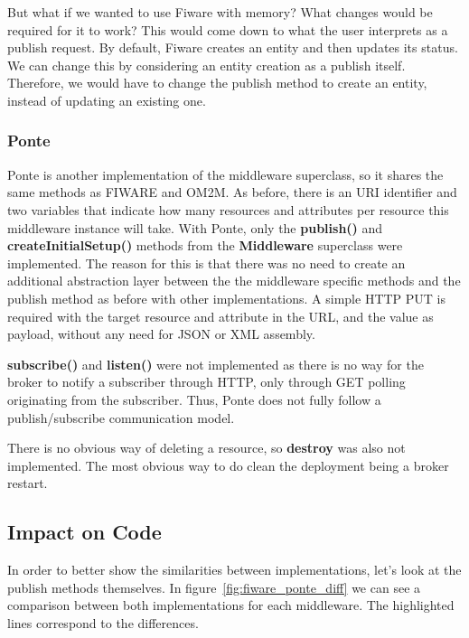 \documentclass[conference]{IEEEtran}
\begin{document}
But what if we wanted to use Fiware with memory? What changes would be required for it to work? This would come down to what the user interprets as a publish request. By default, Fiware creates an entity and then updates its status. We can change this by considering an entity creation as a publish itself. Therefore, we would have to change the publish method to create an entity, instead of updating an existing one.

%
\subsubsection{Ponte}

Ponte is another implementation of the middleware superclass, so it shares the same methods as FIWARE and OM2M.
As before, there is an URI identifier and two variables that indicate how many resources and attributes per resource this middleware instance will take. With Ponte, only the \textbf{publish()} and \textbf{createInitialSetup()} methods from the \textbf{Middleware} superclass were implemented. The reason for this is that there was no need to create an additional abstraction layer between the the middleware specific methods and the publish method as before with other implementations. A simple HTTP PUT is required with the target resource and attribute in the URL, and the value as payload, without any need for JSON or XML assembly.

\textbf{subscribe()} and \textbf{listen()} were not implemented as there is no way for the broker to notify a subscriber through HTTP, only through GET polling originating from the subscriber. Thus, Ponte does not fully follow a  publish/subscribe communication model.

There is no obvious way of deleting a resource, so \textbf{destroy} was also not implemented. The most obvious way to do clean the deployment being a broker restart. 

\subsection{Impact on Code}

In order to better show the similarities between implementations, let's look at the publish methods themselves. In figure~\ref{fig:fiware_ponte_diff} we can see a comparison between both implementations for each middleware. The highlighted lines correspond to the differences.
\end{document}
